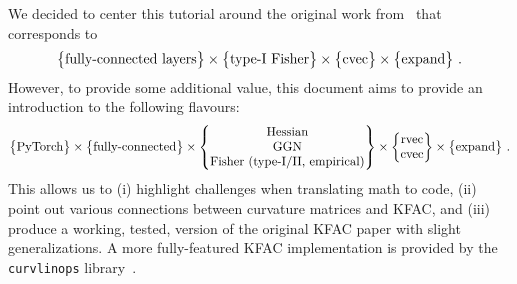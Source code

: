We decided to center this tutorial around the original work from~\citet{martens2015optimizing} that corresponds to
\begin{align*}
  \begin{Bmatrix}
    \text{fully-connected layers}
  \end{Bmatrix}
  \times
  \begin{Bmatrix}
    \text{type-I Fisher}
  \end{Bmatrix}
  \times
  \begin{Bmatrix}
    \operatorname{cvec}
  \end{Bmatrix}
  \times
  \begin{Bmatrix}
    \text{expand}
  \end{Bmatrix}\,.
\end{align*}
However, to provide some additional value, this document aims to provide an introduction to the following flavours:
\begin{align*}
  \begin{Bmatrix}
    \text{PyTorch}
  \end{Bmatrix}
  \times
  \begin{Bmatrix}
    \text{fully-connected}
  \end{Bmatrix}
  \times
  \begin{Bmatrix}
    \text{Hessian}
    \\
    \text{GGN}
    \\
    \text{Fisher (type-I/II, empirical)}
  \end{Bmatrix}
  \times
  \begin{Bmatrix}
    \operatorname{rvec}
    \\
    \operatorname{cvec}
  \end{Bmatrix}
  \times
  \begin{Bmatrix}
    \text{expand}
  \end{Bmatrix}\,.
\end{align*}
This allows us to (i) highlight challenges when translating math to code, (ii) point out various connections between curvature matrices and KFAC, and (iii) produce a working, tested, version of the original KFAC paper with slight generalizations.
A more fully-featured KFAC implementation is provided by the \texttt{curvlinops} library~\cite{dangel2025position}.
